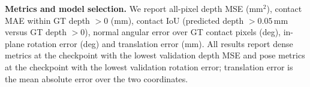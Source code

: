 \noindent\textbf{Metrics and model selection.} We report all-pixel depth MSE (mm$^2$), contact MAE within GT depth $>0$ (mm), contact IoU (predicted depth $>0.05\,$mm versus GT depth $>0$), normal angular error over GT contact pixels (deg), in-plane rotation error (deg) and translation error (mm). All results report dense metrics at the checkpoint with the lowest validation depth MSE and pose metrics at the checkpoint with the lowest validation rotation error; translation error is the mean absolute error over the two coordinates.
